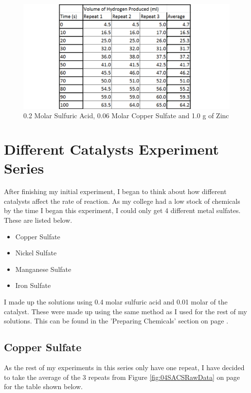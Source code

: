 \begin{figure}[H]
    \includegraphics[width=\textwidth]{./Experiment/Images/3ChangeCatalyst/006Molar.pdf}
    \caption{0.2 Molar Sulfuric Acid, 0.06 Molar Copper Sulfate and 1.0 g of Zinc} \label{fig:006MolarCSRawData}
\end{figure}



\section{Different Catalysts Experiment Series}

After finishing my initial experiment, I began to think about how different catalysts affect the rate of reaction. As my college had a low stock of chemicals by the time I began this experiment, I could only get 4 different metal sulfates. These are listed below.

\begin{itemize}
\item Copper Sulfate
\item Nickel Sulfate
\item Manganese Sulfate
\item Iron Sulfate
\end{itemize}

I made up the solutions using 0.4 molar sulfuric acid and 0.01 molar of the catalyst. These were made up using the same method as I used for the rest of my solutions. This can be found in the 'Preparing Chemicals' section on page \pageref{Preparing Chemicals}.

	\subsection{Copper Sulfate}

As the rest of my experiments in this series only have one repeat, I have decided to take the average of the 3 repeats from Figure \ref{fig:04SACSRawData} on page \pageref{fig:04SACSRawData} for the table shown below.

